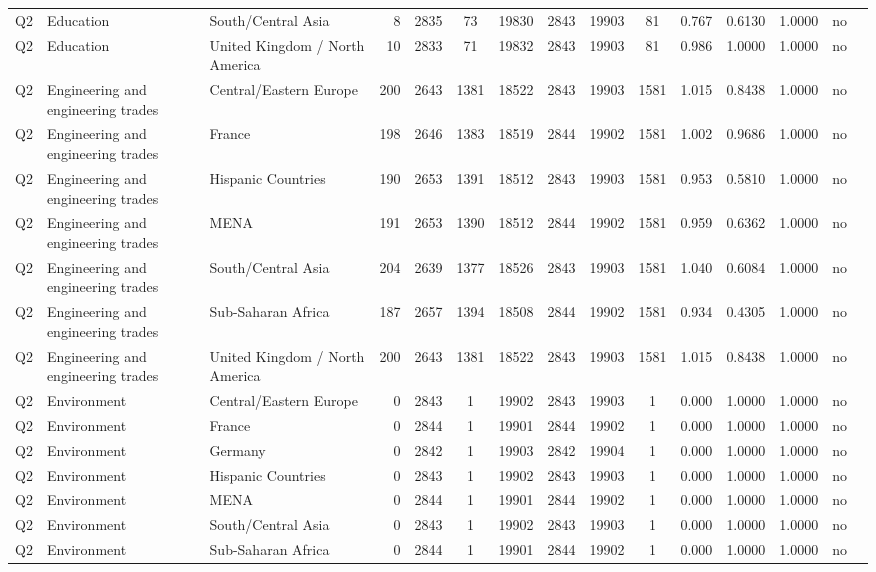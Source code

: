 \begin{longtable}{lllrcccccccccll}
Q2 & Education & South/Central Asia & 8 & 2835 & 73 & 19830 & 2843 & 19903 & 81 & 0.767 & 0.6130 & 1.0000 & no \\
Q2 & Education & United Kingdom / North America & 10 & 2833 & 71 & 19832 & 2843 & 19903 & 81 & 0.986 & 1.0000 & 1.0000 & no \\
Q2 & Engineering and engineering trades & Central/Eastern Europe & 200 & 2643 & 1381 & 18522 & 2843 & 19903 & 1581 & 1.015 & 0.8438 & 1.0000 & no \\
Q2 & Engineering and engineering trades & France & 198 & 2646 & 1383 & 18519 & 2844 & 19902 & 1581 & 1.002 & 0.9686 & 1.0000 & no \\
Q2 & Engineering and engineering trades & Hispanic Countries & 190 & 2653 & 1391 & 18512 & 2843 & 19903 & 1581 & 0.953 & 0.5810 & 1.0000 & no \\
Q2 & Engineering and engineering trades & MENA & 191 & 2653 & 1390 & 18512 & 2844 & 19902 & 1581 & 0.959 & 0.6362 & 1.0000 & no \\
Q2 & Engineering and engineering trades & South/Central Asia & 204 & 2639 & 1377 & 18526 & 2843 & 19903 & 1581 & 1.040 & 0.6084 & 1.0000 & no \\
Q2 & Engineering and engineering trades & Sub-Saharan Africa & 187 & 2657 & 1394 & 18508 & 2844 & 19902 & 1581 & 0.934 & 0.4305 & 1.0000 & no \\
Q2 & Engineering and engineering trades & United Kingdom / North America & 200 & 2643 & 1381 & 18522 & 2843 & 19903 & 1581 & 1.015 & 0.8438 & 1.0000 & no \\
Q2 & Environment & Central/Eastern Europe & 0 & 2843 & 1 & 19902 & 2843 & 19903 & 1 & 0.000 & 1.0000 & 1.0000 & no \\
Q2 & Environment & France & 0 & 2844 & 1 & 19901 & 2844 & 19902 & 1 & 0.000 & 1.0000 & 1.0000 & no \\
Q2 & Environment & Germany & 0 & 2842 & 1 & 19903 & 2842 & 19904 & 1 & 0.000 & 1.0000 & 1.0000 & no \\
Q2 & Environment & Hispanic Countries & 0 & 2843 & 1 & 19902 & 2843 & 19903 & 1 & 0.000 & 1.0000 & 1.0000 & no \\
Q2 & Environment & MENA & 0 & 2844 & 1 & 19901 & 2844 & 19902 & 1 & 0.000 & 1.0000 & 1.0000 & no \\
Q2 & Environment & South/Central Asia & 0 & 2843 & 1 & 19902 & 2843 & 19903 & 1 & 0.000 & 1.0000 & 1.0000 & no \\
Q2 & Environment & Sub-Saharan Africa & 0 & 2844 & 1 & 19901 & 2844 & 19902 & 1 & 0.000 & 1.0000 & 1.0000 & no \\

\end{longtable}
